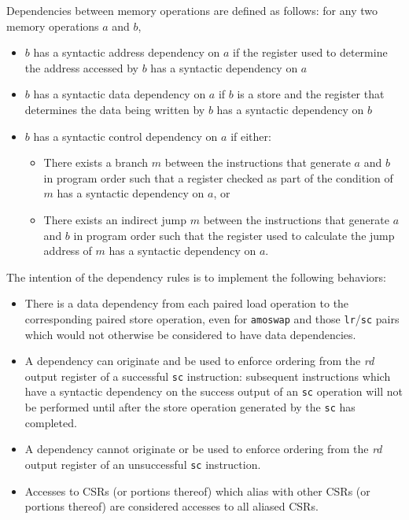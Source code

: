 Dependencies between memory operations are defined as follows: for any two memory operations $a$ and $b$,
\begin{itemize}
\item $b$ has a syntactic address dependency on $a$ if the register used to determine the address accessed by $b$ has a syntactic dependency on $a$
\item $b$ has a syntactic data dependency on $a$ if $b$ is a store and the register that determines the data being written by $b$ has a syntactic dependency on $b$
\item $b$ has a syntactic control dependency on $a$ if either:
  \begin{itemize}
  \item There exists a branch $m$ between the instructions that generate $a$ and $b$ in program order such that a register checked as part of the condition of $m$ has a syntactic dependency on $a$, or
  \item There exists an indirect jump $m$ between the instructions that generate $a$ and $b$ in program order such that the register used to calculate the jump address of $m$ has a syntactic dependency on $a$.
  \end{itemize}
\end{itemize}

\begin{commentary}
  The intention of the dependency rules is to implement the following behaviors:
  \begin{itemize}
    \item There is a data dependency from each paired load operation to the corresponding paired store operation, even for {\tt amoswap} and those {\tt lr}/{\tt sc} pairs which would not otherwise be considered to have data dependencies.
    \item A dependency can originate and be used to enforce ordering from the {\em rd} output register of a successful {\tt sc} instruction: subsequent instructions which have a syntactic dependency on the success output of an {\tt sc} operation will not be performed until after the store operation generated by the {\tt sc} has completed.
    \item A dependency cannot originate or be used to enforce ordering from the {\em rd} output register of an unsuccessful {\tt sc} instruction.
    \item Accesses to CSRs (or portions thereof) which alias with other CSRs (or portions thereof) are considered accesses to all aliased CSRs.
  \end{itemize}
\end{commentary}

